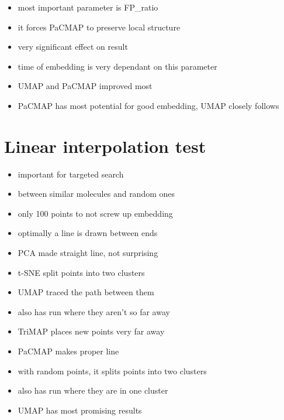 \begin{itemize}
	\item most important parameter is FP\_ratio
	\item it forces PaCMAP to preserve local structure
	\item very significant effect on result
	\item time of embedding is very dependant on this parameter
\end{itemize}

\begin{itemize}
	\item UMAP and PaCMAP improved most
	\item PaCMAP has most potential for good embedding, UMAP closely follows
\end{itemize}

\section{Linear interpolation test}\label{sec:linear-interpolation-test}

\begin{itemize}
	\item important for targeted search
	\item between similar molecules and random ones
	\item only 100 points to not screw up embedding
	\item optimally a line is drawn  between ends
	\item PCA made straight line, not surprising
	\item t-SNE split points into two clusters
	\item UMAP traced the path between them
	\item also has run where they aren't so far away
	\item TriMAP places new points very far away
	\item PaCMAP makes proper line
	\item with random points, it splits points into two clusters
	\item also has run where they are in one cluster
	\item UMAP has most promising results
\end{itemize}
